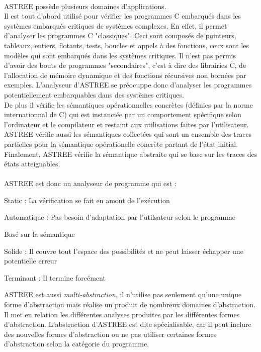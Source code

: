 \documentclass[french]{report}
\begin{document}
\paragraph{}
ASTREE possède plusieurs domaines d'applications. \\
Il est tout d'abord utilisé pour vérifier les programmes C embarqués dans les systèmes embarqués critiques
de systèmes complexes. En effet, il permet d'analyser les programmes C "classiques". Ceci sont composés de pointeurs,
tableaux, entiers, flotants, tests, boucles et appels à des fonctions, ceux sont les modèles qui sont embarqués dans les
systèmes critiques. Il n'est pas permis d'avoir des bouts de programmes "secondaires", c'est à dire des librairies C,
de l'allocation de mémoire dynamique et des fonctions récursives non bornées par exemples. L'analyseur d'ASTREE se
préocuppe donc d'analyser les programmes potentiellement embarquables dans des systèmes critiques. \\
De plus il vérifie les sémantiques opérationnelles concrètes (définies par la norme internationnal de C) qui
est instanciée par un comportement spécifique selon l'ordinateur et le compilateur et restaint aux utilisations faites par
l'utilisateur.
ASTREE vérifie aussi les sémantiques collectées qui sont un ensemble des traces partielles pour
la sémantique opérationelle concrète partant de l'état initial. Finalement, ASTREE vérifie la sémantique abstraite
qui se base sur les traces des états atteignables.

\paragraph{}
ASTREE est donc un analyseur de programme qui est :
\begin{description}
    \item Static : La vérification se fait en amont de l'exécution
    \item Automatique : Pas besoin d'adaptation par l'utilsateur selon le programme
    \item Basé sur la sémantique
    \item Solide : Il couvre tout l'espace des possibilités et ne peut laisser échapper une potentielle erreur
    \item Terminant : Il termine forcément
\end{description}
ASTREE est aussi \textit{multi-abstraction}, il n'utilise pas seulement qu'une unique forme d'abstraction mais réalise
un produit de nombreux domaines d'abstraction. Il met en relation les différentes analyses produites par les différentes
formes d'abstraction. L'abstraction d'ASTREE est dite spécialisable, car il peut inclure des nouvelles
formes d'abstraction ou ne pas utiliser certaines formes d'abstraction selon la catégorie du programme.
\end{document}
